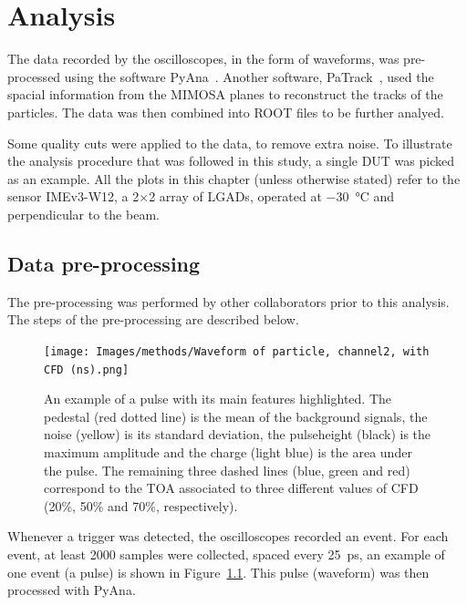 \chapter{Analysis}\label{chap:methods}

The data recorded by the oscilloscopes, in the form of waveforms, was pre-processed using the software PyAna~\cite{atlas_hgtd_pyana_2025}. Another software, PaTrack~\cite{atlas_hgtd_patrack_2025}, used the spacial information from the MIMOSA planes to reconstruct the tracks of the particles. The data was then combined into ROOT files to be further analyed.


Some quality cuts were applied to the data, to remove extra noise. To illustrate the analysis procedure that was followed in this study, a single DUT was picked as an example. All the plots in this chapter (unless otherwise stated) refer to the sensor IMEv3-W12, a 2\(\times\)2 array of LGADs, operated at \qty{-30}{\degreeCelsius} and perpendicular to the beam.

\section{Data pre-processing}

The pre-processing was performed by other collaborators prior to this analysis. The steps of the pre-processing are described below.

\begin{figure}[h!btp]
    \centering
    \texttt{[image: Images/methods/Waveform of particle, channel2, with CFD (ns).png]}
    \captionsetup{width=\captionwidth}
    \caption{An example of a pulse with its main features highlighted. The pedestal (red dotted line) is the mean of the background signals, the noise (yellow) is its standard deviation, the pulseheight (black) is the maximum amplitude and the charge (light blue) is the area under the pulse. The remaining three dashed lines (blue, green and red) correspond to the TOA associated to three different values of CFD (20\%, 50\% and 70\%, respectively).}
    \label{fig:waveform_features}
\end{figure} 

Whenever a trigger was detected, the oscilloscopes recorded an event. For each event, at least 2000 samples were collected, spaced every \qty{25}{\pico\second}, an example of one event (a pulse) is shown in Figure~\ref{fig:waveform_features}. This pulse (waveform) was then processed with PyAna.

